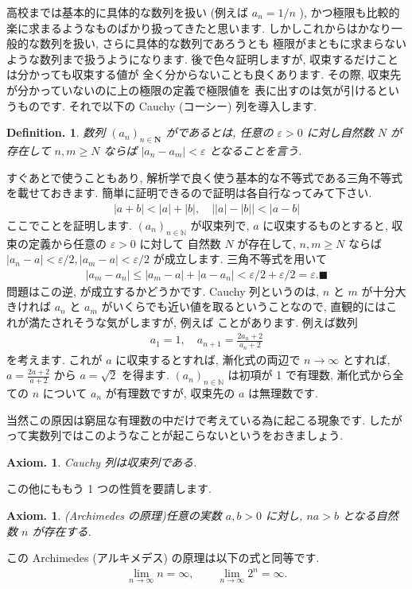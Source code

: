 \documentclass[openany, a4paper, oneside]{jsbook}
\theoremstyle{break}
\theoremstyle{breakdefn}
\newtheorem{axm}[thm]{Axiom.}
\newtheorem{defn}[thm]{Definition.}
\newcommand{\bN}{\mathbb{N}}
\newcommand{\vep}{\varepsilon}
\newcommand{\an}{(a_n)_{n{\in}{\bN}}}
\begin{document}
高校までは基本的に具体的な数列を扱い (例えば $a_n = 1/n$ ),
かつ極限も比較的楽に求まるようなものばかり扱ってきたと思います.
しかしこれからはかなり一般的な数列を扱い, さらに具体的な数列であろうとも
極限がまともに求まらないような数列まで扱うようになります.
後で色々証明しますが, 収束するだけことは分かっても収束する値が
全く分からないことも良くあります.
その際, 収束先が分かっていないのに上の極限の定義で極限値を
表に出すのは気が引けるというものです.
それで以下の Cauchy (コーシー) 列を導入します.
\begin{defn}数列 $(a_n)_{n \in \bm{N}}$ がであるとは,
任意の $\varepsilon >0$ に対し自然数 $N$ が存在して
 $n,m \geq N$ ならば $|a_n - a_m|<\varepsilon$ となることを言う.
\end{defn}
すぐあとで使うこともあり, 解析学で良く使う基本的な不等式である三角不等式を載せておきます.
簡単に証明できるので証明は各自行なってみて下さい.
    \begin{align}
        |a+b|<|a|+|b|,
        \quad
        \bigl | |a|-|b| \bigr | < |a-b|
    \end{align}
ここでことを証明します.
 $\an$ が収束列で,  $a$ に収束するものとすると, 収束の定義から任意の $\vep>0$ に対して
自然数 $N$ が存在して,  $n,m\geq N$ ならば $|a_n-a|<\vep/2,|a_m-a|<\vep/2$ が成立します.
三角不等式を用いて
    \begin{align}
        |a_m - a_n|
        \leq
        |a_m - a | + |a - a_n |
        <\vep/2 + \vep/2
        =
        \vep. \blacksquare
    \end{align}
問題はこの逆, が成立するかどうかです.
Cauchy 列というのは,  $n$ と $m$ が十分大きければ $a_n$ と $a_m$ がいくらでも近い値を取るということなので,
直観的にはこれが満たされそうな気がしますが, 例えば
ことがあります.
例えば数列
    \begin{align}
        a_1=1,
        \quad
        a_{n+1}
        =
        \frac{2a_n+2} {a_n+2}
    \end{align}
を考えます. これが $a$ に収束するとすれば, 漸化式の両辺で $n\to\infty$ とすれば,
 $a=\frac{2a+2}{a+2}$ から $a=\sqrt{2}$ を得ます.
 $\an$ は初項が 1 で有理数, 漸化式から全ての $n$ について $a_n$ が有理数ですが, 収束先の $a$ は無理数です.

当然この原因は窮屈な有理数の中だけで考えている為に起こる現象です.
したがって実数列ではこのようなことが起こらないというをおきましょう.
    \begin{axm}Cauchy 列は収束列である.
    \end{axm}
この他にももう 1 つの性質を要請します.
    \begin{axm}(Archimedes の原理)任意の実数 $a,b>0$ に対し,  $n a>b$ となる自然数 $n$ が存在する.
    \end{axm}
この Archimedes (アルキメデス) の原理は以下の式と同等です.
    \begin{align}
        \lim_{n\to\infty}n=\infty,
        \qquad
        \lim_{n\to\infty}2^n=\infty.
    \end{align}
\end{document}
